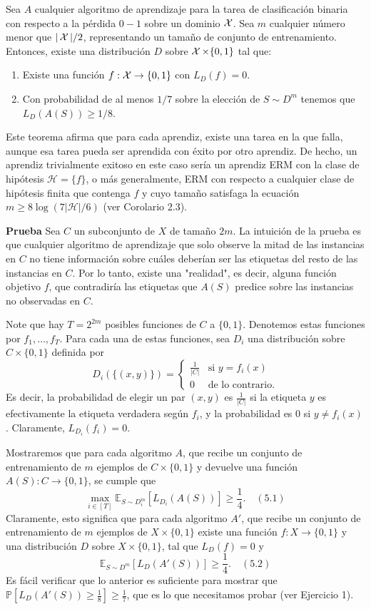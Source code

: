 \begin{teo}
Sea $A$ cualquier algoritmo de aprendizaje para la tarea de clasificación binaria con respecto a la pérdida $0 - 1$ sobre un dominio $\mathop{\mbox{$\mathcal{X}$}}\nolimits$. Sea $m$ cualquier número menor que $|\mathop{\mbox{$\mathcal{X}$}}\nolimits|/2$, representando un tamaño de conjunto de entrenamiento. Entonces, existe una distribución $D$ sobre $\mathop{\mbox{$\mathcal{X}$}}\nolimits \times \{0, 1\}$ tal que:
\begin{enumerate}
    \item Existe una función $f: \mathop{\mbox{$\mathcal{X}$}}\nolimits \rightarrow \{0, 1\}$ con $L_D(f) = 0$.
    \item Con probabilidad de al menos $1/7$ sobre la elección de $S \sim D^m$ tenemos que $L_D(A(S)) \geq 1/8$.
\end{enumerate}
Este teorema afirma que para cada aprendiz, existe una tarea en la que falla, aunque esa tarea pueda ser aprendida con éxito por otro aprendiz. De hecho, un aprendiz trivialmente exitoso en este caso sería un aprendiz ERM con la clase de hipótesis $\mathcal{H} = \{f\}$, o más generalmente, ERM con respecto a cualquier clase de hipótesis finita que contenga $f$ y cuyo tamaño satisfaga la ecuación $m \geq 8 \log(7|\mathcal{H}|/6)$ (ver Corolario 2.3).

\textbf{Prueba} Sea $C$ un subconjunto de $X$ de tamaño $2m$. La intuición de la prueba es que cualquier algoritmo de aprendizaje que solo observe la mitad de las instancias en $C$ no tiene información sobre cuáles deberían ser las etiquetas del resto de las instancias en $C$. Por lo tanto, existe una "realidad", es decir, alguna función objetivo $f$, que contradiría las etiquetas que $A(S)$ predice sobre las instancias no observadas en $C$.

Note que hay $T = 2^{2m}$ posibles funciones de $C$ a $\{0, 1\}$. Denotemos estas funciones por $f_1, \ldots, f_T$. Para cada una de estas funciones, sea $D_i$ una distribución sobre $C \times \{0, 1\}$ definida por
$$
D_i(\{(x, y)\}) = 
\begin{cases} 
\frac{1}{|C|} & \text{si } y = f_i(x) \\
0 & \text{de lo contrario}.
\end{cases}
$$
Es decir, la probabilidad de elegir un par $(x, y)$ es $\frac{1}{|C|}$ si la etiqueta $y$ es efectivamente la etiqueta verdadera según $f_i$, y la probabilidad es $0$ si $y \neq f_i(x)$. Claramente, $L_{D_i}(f_i) = 0$.

Mostraremos que para cada algoritmo $A$, que recibe un conjunto de entrenamiento de $m$ ejemplos de $C \times \{0, 1\}$ y devuelve una función $A(S) : C \rightarrow \{0, 1\}$, se cumple que
$$
\max_{i \in [T]} \mathbb{E}_{S \sim D_i^m}[L_{D_i}(A(S))] \geq \frac{1}{4}. \quad (5.1)
$$
Claramente, esto significa que para cada algoritmo $A'$, que recibe un conjunto de entrenamiento de $m$ ejemplos de $X \times \{0, 1\}$ existe una función $f : X \rightarrow \{0, 1\}$ y una distribución $D$ sobre $X \times \{0, 1\}$, tal que $L_D(f) = 0$ y
$$
\mathbb{E}_{S \sim D^m}[L_D(A'(S))] \geq \frac{1}{4}. \quad (5.2)
$$
Es fácil verificar que lo anterior es suficiente para mostrar que $\mathbb{P}[L_D(A'(S)) \geq \frac{1}{8}] \geq \frac{1}{7}$, que es lo que necesitamos probar (ver Ejercicio 1).


\end{teo}
